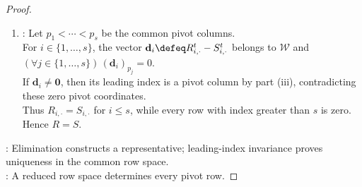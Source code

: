 \begin{theorem}
\begin{proof}
\begin{enumerate}[label=(\roman*)]
$\mathbf{v}=\sum\limits_{i=1}^{h}c_iX_{i,\cdot}^t$, set $a\defeq\min\{i:c_i\neq0\}$. The RREF conditions imply $(\forall j\in\{1,\ldots,q_a-1\})\,v_j=0$ and $v_{q_a}=c_a\neq0$, so $\ell(\mathbf{v})=q_a$.\\
Conversely, $\ell(X_{i,\cdot}^t)=q_i$. Therefore $\{\ell(\mathbf{v}):\mathbf{v}\in\mathcal{W}\setminus\{\mathbf{0}\}\}$ is the pivot set of both $R$ and $S$.
\item {}: Let $p_1<\cdots<p_s$ be the common pivot columns.\\
For $i\in\{1,\ldots,s\}$, the vector $\mathbf{d}_i\defeq R_{i,\cdot}^t-S_{i,\cdot}^t$ belongs to $\mathcal{W}$ and $(\forall j\in\{1,\ldots,s\})\,(\mathbf{d}_i)_{p_j}=0$.\\
If $\mathbf{d}_i\neq\mathbf{0}$, then its leading index is a pivot column by part (iii), contradicting these zero pivot coordinates.\\
Thus $R_{i,\cdot}=S_{i,\cdot}$ for $i\leq s$, while every row with index greater than $s$ is zero. Hence $R=S$.
\end{enumerate}
: Elimination constructs a representative; leading-index invariance proves uniqueness in the common row space.\\
: A reduced row space determines every pivot row.
\end{proof}
\end{theorem}


